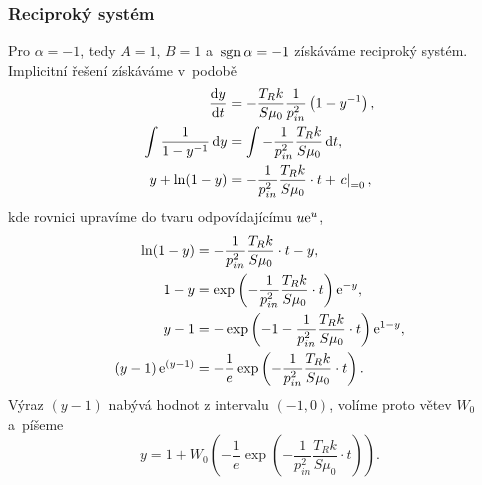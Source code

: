 \subsubsection{Reciproký systém}\label{sss:reciproky_system}
Pro $\alpha=-1$, tedy $A=1$, $B=1$ a~$\operatorname{sgn}{\alpha}=-1$ získáváme reciproký systém. Implicitní řešení získáváme v~podobě
\begin{subequations}
\begin{align}
    \frac{\mathrm{d} y}{\mathrm{d} t}&=-\frac{T_R k}{S \mu_0}\frac{1}{p_{in}^2}\left(1-y^{-1}\right),\\
    \int\frac{1}{1-y^{-1}}\,\mathrm{d}{y}&=\int-\frac{1}{p_{in}^2}\frac{T_R k}{S \mu_0}\,\mathrm{d}{t},\\
    y+\ln(1-y)&=-\frac{1}{p_{in}^2}\frac{T_R k}{S \mu_0}\cdot t+\left.c\right|_{=0},
\end{align}
\end{subequations}
kde rovnici upravíme do tvaru odpovídajícímu $u\mathrm{e}^{u}$,
\begin{subequations}
    \begin{align}
    \ln(1-y)&=-\frac{1}{p_{in}^2}\frac{T_R k}{S \mu_0}\cdot t-y,\\
    1-y&=\exp\left(-\frac{1}{p_{in}^2}\frac{T_R k}{S \mu_0}\cdot t\right)\mathrm{e}^{-y},\\
    y-1&=-\exp\left(-1-\frac{1}{p_{in}^2}\frac{T_R k}{S \mu_0}\cdot t\right)\mathrm{e}^{1-y},\\
    \left(y-1\right)\mathrm{e}^{(y-1)}&=-\frac{1}{e}\exp\left(-\frac{1}{p_{in}^2}\frac{T_R k}{S \mu_0}\cdot t\right).
    \end{align}
\end{subequations}
Výraz $(y-1)$ nabývá hodnot z intervalu $(-1,0)$, volíme proto větev $W_0$ a~píšeme
\begin{equation}
    y=1+W_{0}\left(-\frac{1}{e}\exp\left(-\frac{1}{p_{in}^2}\frac{T_R k}{S \mu_0}\cdot t\right)\right).
\end{equation}

